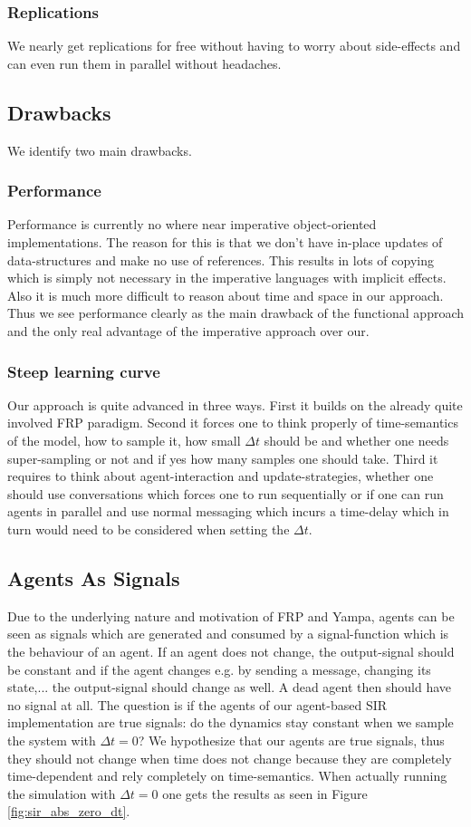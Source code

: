 \subsubsection{Replications}
We nearly get replications for free without having to worry about side-effects and can even run them in parallel without headaches.

\subsection{Drawbacks}
We identify two main drawbacks.

\subsubsection{Performance}
Performance is currently no where near imperative object-oriented implementations. The reason for this is that we don't have in-place updates of data-structures and make no use of references. This results in lots of copying which is simply not necessary in the imperative languages with implicit effects. Also it is much more difficult to reason about time and space in our approach. Thus we see performance clearly as the main drawback of the functional approach and the only real advantage of the imperative approach over our.

\subsubsection{Steep learning curve}
Our approach is quite advanced in three ways. First it builds on the already quite involved FRP paradigm. Second it forces one to think properly of time-semantics of the model, how to sample it, how small $\Delta t$ should be and whether one needs super-sampling or not and if yes how many samples one should take. Third it requires to think about agent-interaction and update-strategies, whether one should use conversations which forces one to run sequentially or if one can run agents in parallel and use normal messaging which incurs a time-delay which in turn would need to be considered when setting the $\Delta t$.

\subsection{Agents As Signals}
Due to the underlying nature and motivation of FRP and Yampa, agents can be seen as signals which are generated and consumed by a signal-function which is the behaviour of an agent.  If an agent does not change, the output-signal should be constant and if the agent changes e.g. by sending a message, changing its state,... the output-signal should change as well. A dead agent then should have no signal at all.
The question is if the agents of our agent-based SIR implementation are true signals: do the dynamics stay constant when we sample the system with $\Delta t = 0$? We hypothesize that our agents are true signals, thus they should not change when time does not change because they are completely time-dependent and rely completely on time-semantics. When actually running the simulation with $\Delta t = 0$ one gets the results as seen in Figure \ref{fig:sir_abs_zero_dt}.
